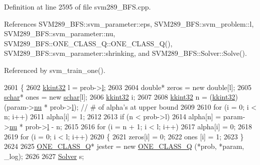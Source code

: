 Definition at line 2595 of file svm289\+\_\+\+B\+F\+S.\+cpp.



References S\+V\+M289\+\_\+\+B\+F\+S\+::svm\+\_\+parameter\+::eps, S\+V\+M289\+\_\+\+B\+F\+S\+::svm\+\_\+problem\+::l, S\+V\+M289\+\_\+\+B\+F\+S\+::svm\+\_\+parameter\+::nu, S\+V\+M289\+\_\+\+B\+F\+S\+::\+O\+N\+E\+\_\+\+C\+L\+A\+S\+S\+\_\+\+Q\+::\+O\+N\+E\+\_\+\+C\+L\+A\+S\+S\+\_\+\+Q(), S\+V\+M289\+\_\+\+B\+F\+S\+::svm\+\_\+parameter\+::shrinking, and S\+V\+M289\+\_\+\+B\+F\+S\+::\+Solver\+::\+Solve().



Referenced by svm\+\_\+train\+\_\+one().


\begin{DoxyCode}
2601 \{
2602   \hyperlink{namespace_k_k_b_a8fa4952cc84fda1de4bec1fbdd8d5b1b}{kkint32} l = prob->\hyperlink{struct_s_v_m289___b_f_s_1_1svm__problem_afd75fe2ff65aa0c0f27b85b04028b2f3}{l};
2603 
2604   \textcolor{keywordtype}{double}*   zeros = \textcolor{keyword}{new} \textcolor{keywordtype}{double}[l];
2605   \hyperlink{namespace_s_v_m289___b_f_s_a67b51ac46a91cdb7ad72dea9fad6c0f0}{schar}*    ones  = \textcolor{keyword}{new} \hyperlink{namespace_s_v_m289___b_f_s_a67b51ac46a91cdb7ad72dea9fad6c0f0}{schar}[l];
2606   \hyperlink{namespace_k_k_b_a8fa4952cc84fda1de4bec1fbdd8d5b1b}{kkint32} i;
2607 
2608   \hyperlink{namespace_k_k_b_a8fa4952cc84fda1de4bec1fbdd8d5b1b}{kkint32} n = (\hyperlink{namespace_k_k_b_a8fa4952cc84fda1de4bec1fbdd8d5b1b}{kkint32})(param->\hyperlink{struct_s_v_m289___b_f_s_1_1svm__parameter_a6f25339a407582eca1800e6561b24ebc}{nu} * prob->\hyperlink{struct_s_v_m289___b_f_s_1_1svm__problem_afd75fe2ff65aa0c0f27b85b04028b2f3}{l});  \textcolor{comment}{// # of alpha's at upper bound}
2609 
2610   \textcolor{keywordflow}{for}  (i = 0;  i < n;  i++)
2611     alpha[i] = 1;
2612 
2613   \textcolor{keywordflow}{if}  (n < prob->l)
2614     alpha[n] = param->\hyperlink{struct_s_v_m289___b_f_s_1_1svm__parameter_a6f25339a407582eca1800e6561b24ebc}{nu} * prob->\hyperlink{struct_s_v_m289___b_f_s_1_1svm__problem_afd75fe2ff65aa0c0f27b85b04028b2f3}{l} - n;
2615 
2616   \textcolor{keywordflow}{for}  (i = n + 1;  i < l;  i++)
2617     alpha[i] = 0;
2618 
2619   \textcolor{keywordflow}{for}  (i = 0;  i < l;  i++)
2620   \{
2621     zeros[i] = 0;
2622     ones [i] = 1;
2623   \}
2624 
2625   \hyperlink{class_s_v_m289___b_f_s_1_1_o_n_e___c_l_a_s_s___q}{ONE\_CLASS\_Q}*  jester = \textcolor{keyword}{new} \hyperlink{class_s_v_m289___b_f_s_1_1_o_n_e___c_l_a_s_s___q}{ONE\_CLASS\_Q} (*prob, *param, \_log);
2626 
2627   \hyperlink{class_s_v_m289___b_f_s_1_1_solver}{Solver} s;

\end{DoxyCode}
